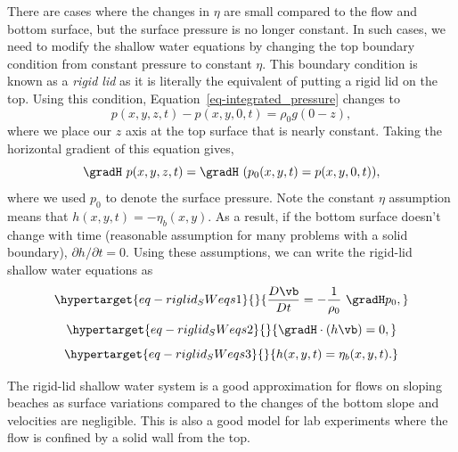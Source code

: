 \documentclass[
  letterpaper,
  twocolumn,
  landscape]{report}
\begin{document}
There are cases where the changes in \(\eta\) are small compared to the
flow and bottom surface, but the surface pressure is no longer constant.
In such cases, we need to modify the shallow water equations by changing
the top boundary condition from constant pressure to constant \(\eta\).
This boundary condition is known as a \emph{rigid lid} as it is
literally the equivalent of putting a rigid lid on the top. Using this
condition, Equation~\ref{eq-integrated_pressure} changes to
\[    p(x,y,z,t) - p(x,y,0,t) = \rho_0 g (0 - z), \] where we place our
\(z\) axis at the top surface that is nearly constant. Taking the
horizontal gradient of this equation gives,
\[  \gradH \ p(x,y,z,t)  = \gradH \ (p_0(x,y,t) =p(x,y,0,t)), \] where
we used \(p_0\) to denote the surface pressure. Note the constant
\(\eta\) assumption means that \(h(x,y,t) = - \eta_b(x,y)\). As a
result, if the bottom surface doesn't change with time (reasonable
assumption for many problems with a solid boundary),
\(\partial h /\partial t =0\). Using these assumptions, we can write the
rigid-lid shallow water equations as
\begin{equation}\protect\hypertarget{eq-riglid_SWeqs1}{}{ \frac{D \vb}{D t}  =  - \frac{1}{\rho_0}\ \gradH p_0, }\label{eq-riglid_SWeqs1}\end{equation}
\begin{equation}\protect\hypertarget{eq-riglid_SWeqs2}{}{ \gradH \cdot (h \vb) = 0, }\label{eq-riglid_SWeqs2}\end{equation}
\begin{equation}\protect\hypertarget{eq-riglid_SWeqs3}{}{ h(x,y,t) = \eta_b(x,y,t).}\label{eq-riglid_SWeqs3}\end{equation}

\begin{tcolorbox}[enhanced jigsaw, toprule=.15mm, left=2mm, opacityback=0, breakable, arc=.35mm, colback=white, rightrule=.15mm, bottomrule=.15mm, colframe=quarto-callout-note-color-frame, leftrule=.75mm]
\begin{minipage}[t]{5.5mm}
\textcolor{quarto-callout-note-color}{\faInfo}
\end{minipage}%
\begin{minipage}[t]{\textwidth - 5.5mm}

The rigid-lid shallow water system is a good approximation for flows on
sloping beaches as surface variations compared to the changes of the
bottom slope and velocities are negligible. This is also a good model
for lab experiments where the flow is confined by a solid wall from the
top.

\end{minipage}%
\end{tcolorbox}
\end{document}
